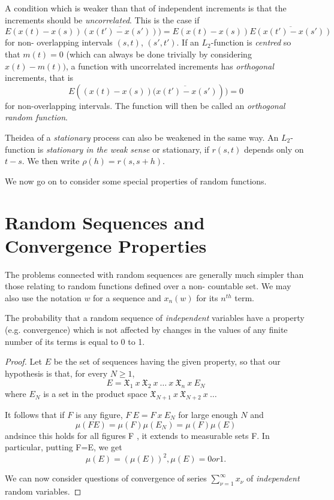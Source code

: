   A condition which is weaker than that of independent  increments is
  that the increments should be \textit{uncorrelated}. This is the
  case if $E(x(t) 
  - x(s)) \overline{(x(t')- x(s'))}) =E (x(t) - x(s)) \overline{E
    (x(t') -x (s'))}$ for non- overlapping intervals $(s, t)$, $(s' ,
  t')$. If an $L_2$-function is \textit{centred} so that $m(t) =0$ (which can
  always be done trivially by considering $x(t) - m(t))$,  a function
  with uncorrelated increments has \textit{orthogonal} increments, that is  
  $$ 
  E ((x(t) - x(s)) \overline{(x(t') - x (s')})) =0 
  $$
  for non-overlapping intervals. The function will then be called an
  \textit{orthogonal random function}. 
  
  The\pageoriginale idea of a \textit{stationary} process can also be weakened in the same
  way. An $L_2$- function is \textit{stationary in the weak sense} or
  stationary, if $r(s , t)$ depends only on $t - s$. We then write $\rho(h) =
  r (s,s + h)$. 
  
  We now go on to consider some special properties of random functions.

\section{Random Sequences and Convergence Properties}\label{chap2:sec13}

The problems connected with random sequences are generally much
simpler than those relating to random  functions defined over a non-
countable set. We may also use the notation $w$ for a sequence and $x_n
(w)$ for its $n^{th}$ term. 

\begin{theorem}\label{chap2:sec13:thm46} 
  The probability that a random sequence of \textit{independent} variables have a
  property (e.g. convergence) which is not affected by changes in the
  values of any finite number of its terms is equal to 0 to 1. 
\end{theorem}

\begin{proof}
  Let $E$ be the set of sequences having the given property, so that our
  hypothesis is that, for every $N \geq 1$,  
  $$ 
  E= \mathfrak{X}_1 ~x~ \mathfrak{X}_2 ~x~ \ldots ~x~ \mathfrak{X}_n ~x~ E_N
  $$
  where $E_N$ is a set in the product space $\mathfrak{X}_{N+1} ~x~
  \mathfrak{X}_{N+2} ~x~ \ldots $ 
  
  It follows that if $F$ is any figure, $F ~E = F ~x~ E_N$ for large
  enough $N$ and  
  $$ 
  \mu (FE) = \mu (F) \mu (E_N) = \mu (F) \mu (E) 
  $$ 
  and\pageoriginale since this holds for all figures F , it extends to measurable
  sets F. In particular, putting F=E, we get 
  $$
  \mu (E) = (\mu(E))^2 , \mu(E) =0 or 1.
  $$
  
  We can now consider questions of convergence of series
  $\sum\limits^{\infty}_{\nu = 1} x_\nu$ of \textit{independent}
  random variables. 
\end{proof}

